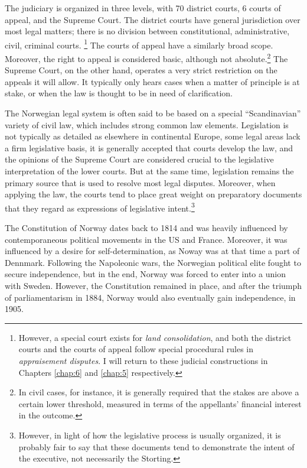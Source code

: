 The judiciary is organized in three levels, with 70 district courts, 6 courts of appeal, and the Supreme Court. The district courts have general jurisdiction over most legal matters; there is no division between constitutional, administrative, civil, criminal courts. \footnote{However, a special court exists for {\it land consolidation}, and both the district courts and the courts of appeal follow special procedural rules in {\it appraisement disputes}. I will return to these judicial constructions in Chapters \ref{chap:6} and \ref{chap:5} respectively.} The courts of appeal have a similarly broad scope. Moreover, the right to appeal is considered basic, although not absolute.\footnote{In civil cases, for instance, it is generally required that the stakes are above a certain lower threshold, measured in terms of the appellants' financial interest in the outcome.}  The Supreme Court, on the other hand, operates a very strict restriction on the appeals it will allow. It typically only hears cases when a matter of principle is at stake, or when the law is thought to be in need of clarification.

The Norwegian legal system is often said to be based on a special ``Scandinavian'' variety of civil law, which includes strong common law elements. Legislation is not typically as detailed as elsewhere in continental Europe, some legal areas lack a firm legislative basis,  it is generally accepted that courts develop the law, and the opinions of the Supreme Court are considered crucial to the legislative interpretation of the lower courts. But at the same time, legislation remains the primary source that is used to resolve most legal disputes. Moreover, when applying the law, the courts tend to place great weight on preparatory documents that they regard as expressions of legislative intent.\footnote{However, in light of how the legislative process is usually organized, it is probably fair to say that these documents tend to demonstrate the intent of the executive, not necessarily the Storting.}

The Constitution of Norway dates back to 1814 and was heavily influenced by contemporaneous political movements in the US and France. Moreover, it was influenced by a desire for self-determination, as Noway was at that time a part of Dennmark. Following the Napoleonic wars, the Norwegian political elite fought to secure independence, but in the end, Norway was forced to enter into a union with Sweden. However, the Constitution remained in place, and after the triumph of parliamentarism in 1884, Norway would also eventually gain independence, in 1905.

